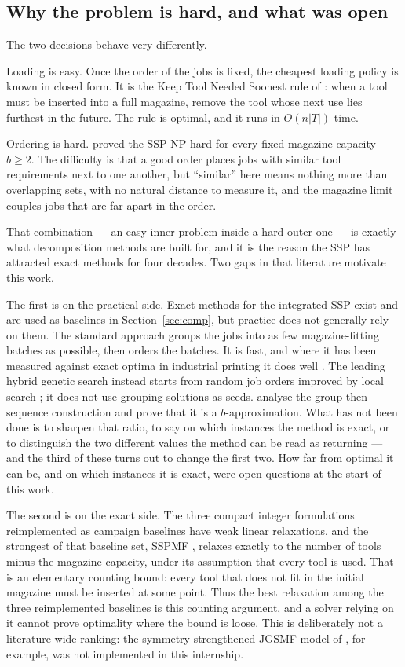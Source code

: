 \subsection{Why the problem is hard, and what was open}\label{ssec:intro-why}

The two decisions behave very differently.

Loading is easy. Once the order of the jobs is fixed, the cheapest loading policy is
known in closed form. It is the Keep Tool Needed Soonest rule of \citet{Tang1988}:
when a tool must be inserted into a full magazine, remove the tool whose next use
lies furthest in the future. The rule is optimal, and it runs in
$O(n\lvert T\rvert)$ time.

Ordering is hard. \citet{Crama1994} proved the SSP NP-hard for every fixed magazine
capacity $b\ge2$. The difficulty is that a good order places jobs with similar tool
requirements next to one another, but ``similar'' here means nothing more than
overlapping sets, with no natural distance to measure it, and the magazine limit
couples jobs that are far apart in the order.

That combination --- an easy inner problem inside a hard outer one --- is exactly
what decomposition methods are built for, and it is the reason the SSP has attracted
exact methods for four decades. Two gaps in that literature motivate this work.

The first is on the practical side. Exact methods for the integrated SSP exist and
are used as baselines in Section~\ref{sec:comp}, but practice does not generally rely on
them. The standard
approach groups the jobs into as few magazine-fitting batches as possible, then
orders the batches. It is fast, and where it has been measured against exact optima in
industrial printing it does well \citep{Burger2015}. The leading hybrid genetic search
instead starts from random job orders improved by local search \citep{Mecler2021}; it
does not use grouping solutions as seeds. \citet{CramaKlundert1999} analyse the
group-then-sequence construction and prove
that it is a $b$-approximation. What has not been done is to sharpen that ratio, to say
on which instances the method is exact, or to distinguish the two different values the
method can be read as returning --- and the third of these turns out to change the first
two. How far
from optimal it can be, and on which instances it is exact, were open questions at the
start of this work.

The second is on the exact side. The three compact integer formulations reimplemented
as campaign baselines have weak linear relaxations, and the strongest of that baseline
set, SSPMF \citep{daSilva2024}, relaxes exactly to the number of tools minus the
magazine capacity, under its assumption that every tool is used. That is an
elementary counting bound: every tool that does not fit in the initial magazine must be
inserted at some point. Thus the best relaxation among the three reimplemented
baselines is this counting argument, and a solver relying on it cannot prove optimality
where the bound is loose. This is deliberately not a literature-wide ranking:
the symmetry-strengthened JGSMF model of \citet{Akhundov2024}, for example, was not
implemented in this internship.

